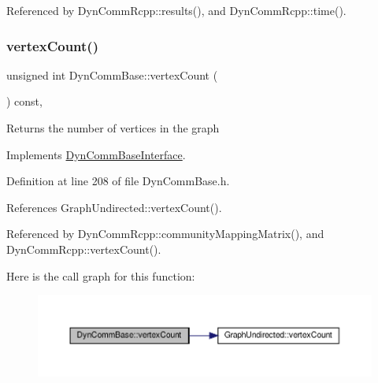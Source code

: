 Referenced by Dyn\+Comm\+Rcpp\+::results(), and Dyn\+Comm\+Rcpp\+::time().

\mbox{\label{classDynCommBase_ae415f1a7792158845f69d6850b762d87}} 
\subsubsection{\texorpdfstring{vertex\+Count()}{vertexCount()}}
{\footnotesize\ttfamily unsigned int Dyn\+Comm\+Base\+::vertex\+Count (\begin{DoxyParamCaption}{ }\end{DoxyParamCaption}) const\hspace{0.3cm}{\ttfamily [inline]}, {\ttfamily [virtual]}}

\begin{DoxyReturn}{Returns}
the number of vertices in the graph 
\end{DoxyReturn}


Implements \hyperlink{classDynCommBaseInterface_a792b9c74e55abbc48fbc078bc5fead0c}{Dyn\+Comm\+Base\+Interface}.



Definition at line 208 of file Dyn\+Comm\+Base.\+h.



References Graph\+Undirected\+::vertex\+Count().



Referenced by Dyn\+Comm\+Rcpp\+::community\+Mapping\+Matrix(), and Dyn\+Comm\+Rcpp\+::vertex\+Count().

Here is the call graph for this function\+:
\nopagebreak
\begin{figure}[H]
\begin{center}
\leavevmode
\includegraphics[width=350pt]{classDynCommBase_ae415f1a7792158845f69d6850b762d87_cgraph}
\end{center}
\end{figure}
\mbox{\label{classDynCommBase_ae240fba572935f26a72f73e39e115169}} 
